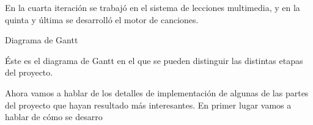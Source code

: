 \documentclass[landscape]{article}
\newenvironment{nota}
{%
\begin{framed} \noindent\itshape
}
{%
\end{framed}\vspace{-0.5cm} }
\begin{document}
\begin{multicols*}{2}
 En la cuarta iteración se trabajó en el sistema de lecciones
multimedia, y  en la quinta y última se desarrolló el motor de
canciones.

\begin{nota}
  Diagrama de Gantt
\end{nota}

Éste es el diagrama de Gantt en el que se pueden distinguir las distintas
etapas del proyecto.

\begin{nota}
  
\end{nota}

Ahora vamos a hablar de los detalles de implementación de algunas de las partes
del proyecto que hayan resultado más interesantes. En primer lugar vamos a
hablar de cómo se desarro


 \vfill \pagebreak


\end{multicols*}
\end{document}
